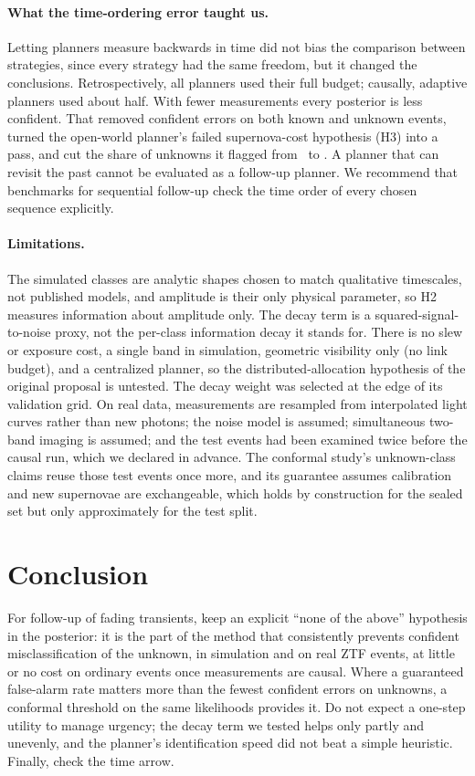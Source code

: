 \paragraph{What the time-ordering error taught us.} Letting planners measure backwards in time did not bias the comparison between strategies, since every strategy had the same freedom, but it changed the conclusions. Retrospectively, all planners used their full budget; causally, adaptive planners used about half. With fewer measurements every posterior is less confident. That removed confident errors on both known and unknown events, turned the open-world planner's failed supernova-cost hypothesis (H3) into a pass, and cut the share of unknowns it flagged from \RealRFlagP\ to \RealCFlagP. A planner that can revisit the past cannot be evaluated as a follow-up planner. We recommend that benchmarks for sequential follow-up check the time order of every chosen sequence explicitly.

\paragraph{Limitations.} The simulated classes are analytic shapes chosen to match qualitative timescales, not published models, and amplitude is their only physical parameter, so H2 measures information about amplitude only. The decay term is a squared-signal-to-noise proxy, not the per-class information decay it stands for. There is no slew or exposure cost, a single band in simulation, geometric visibility only (no link budget), and a centralized planner, so the distributed-allocation hypothesis of the original proposal is untested. The decay weight was selected at the edge of its validation grid. On real data, measurements are resampled from interpolated light curves rather than new photons; the noise model is assumed; simultaneous two-band imaging is assumed; and the test events had been examined twice before the causal run, which we declared in advance. The conformal study's unknown-class claims reuse those test events once more, and its guarantee assumes calibration and new supernovae are exchangeable, which holds by construction for the sealed set but only approximately for the test split.

\section{Conclusion}
For follow-up of fading transients, keep an explicit ``none of the above'' hypothesis in the posterior: it is the part of the method that consistently prevents confident misclassification of the unknown, in simulation and on real ZTF events, at little or no cost on ordinary events once measurements are causal. Where a guaranteed false-alarm rate matters more than the fewest confident errors on unknowns, a conformal threshold on the same likelihoods provides it. Do not expect a one-step utility to manage urgency; the decay term we tested helps only partly and unevenly, and the planner's identification speed did not beat a simple heuristic. Finally, check the time arrow.
